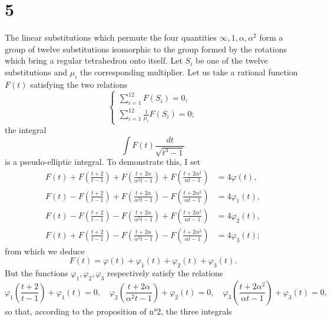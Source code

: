 \documentclass[11pt]{article}
\begin{document}
\section*{5}
The linear substitutions which permute the four quantities $\infty, 1, \alpha, \alpha^{2}$ form a group of twelve substitutions isomorphic to the group formed by the rotations which bring a regular tetrahedron onto itself.
Let $S_{i}$ be one of the twelve substitutions and $\mu_{i}$ the corresponding multiplier. Let us take a rational function $F(t)$ satisfying the two relations
\begin{equation}
\begin{cases}
\sum_{i=1}^{12}F(S_{i})=0, \\
\sum_{i=1}^{12}\frac{1}{\mu_i}F(S_{i})=0;
\end{cases}
\end{equation}
the integral
\begin{equation*}
\int F(t)\frac{dt}{\sqrt{t^{3}-1}}
\end{equation*}
is a pseudo-elliptic integral. To demonstrate this, I set
\begin{align*}
F(t)+F\left(\frac{t+2}{t-1}\right)+F\left(\frac{t+2\alpha}{\alpha^{2}t-1}\right)+F\left(\frac{t+2\alpha^{2}}{\alpha t-1}\right) &= 4\varphi(t), \\
F(t)-F\left(\frac{t+2}{t-1}\right)+F\left(\frac{t+2\alpha}{\alpha^{2}t-1}\right)-F\left(\frac{t+2\alpha^{2}}{\alpha t-1}\right) &= 4\varphi_{1}(t), \\
F(t)-F\left(\frac{t+2}{t-1}\right)-F\left(\frac{t+2\alpha}{\alpha^{2}t-1}\right)+F\left(\frac{t+2\alpha^{2}}{\alpha t-1}\right) &= 4\varphi_{2}(t), \\
F(t)+F\left(\frac{t+2}{t-1}\right)-F\left(\frac{t+2\alpha}{\alpha^{2}t-1}\right)-F\left(\frac{t+2\alpha^{2}}{\alpha t-1}\right) &= 4\varphi_{3}(t);
\end{align*}
from which we deduce
\begin{equation*}
F(t)=\varphi(t)+\varphi_{1}(t)+\varphi_{2}(t)+\varphi_{3}(t).
\end{equation*}
But the functions $\varphi_{1}, \varphi_{2}, \varphi_{3}$ respectively satisfy the relations
\begin{equation*}
\varphi_{1}\left(\frac{t+2}{t-1}\right)+\varphi_{1}(t)=0, \quad \varphi_{2}\left(\frac{t+2\alpha}{\alpha^{2}t-1}\right)+\varphi_{2}(t)=0, \quad \varphi_{3}\left(\frac{t+2\alpha^{2}}{\alpha t-1}\right)+\varphi_{3}(t)=0,
\end{equation*}
so that, according to the proposition of n°2, the three integrals
\end{document}
